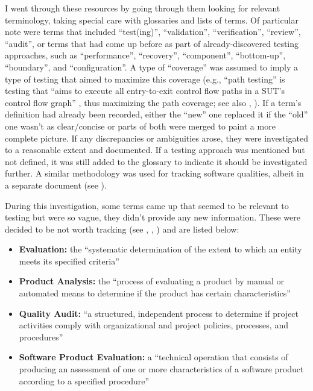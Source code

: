 I went through these resources by going through them looking for relevant
terminology, taking special care with glossaries and lists of terms. Of
particular note were terms that included ``test(ing)'', ``validation'',
``verification'', ``review'', ``audit'', or terms that had come up before
as part of already-discovered testing approaches, such as ``performance'',
``recovery'', ``component'', ``bottom-up'', ``boundary'', and ``configuration''.
A type of ``coverage'' was assumed to imply a type of testing that aimed to
maximize this coverage (e.g., ``path testing'' is testing that ``aims to
execute all entry-to-exit control flow paths in a SUT's control flow graph''
\citep[p.~5013]{SWEBOK2024}, thus maximizing the path coverage; see also
, \citet[Fig.~1]{SharmaEtAl2021}).
If a term's definition had already been recorded, either the ``new'' one
replaced it if the ``old'' one wasn't as clear/concise or parts of both were
merged to paint a more complete picture. If any discrepancies or ambiguities
arose, they were investigated to a reasonable extent and documented. If a
testing approach was mentioned but not defined, it was still added to the
glossary to indicate it should be investigated further. A similar methodology
was used for tracking software qualities, albeit in a separate document
(see ).

During this investigation, some terms came up that seemed to be relevant to
testing but were so vague, they didn't provide any new information. These were
decided to be not worth tracking (see , ,
) and are listed below:

\begin{itemize}
      \item \textbf{Evaluation:} the ``systematic determination of the extent
            to which an entity meets its specified criteria''
            \citep[p.~167]{IEEE2017}
      \item \textbf{Product Analysis:} the ``process of evaluating a product by
            manual or automated means to determine if the product has certain
            characteristics'' \citep[p.~343]{IEEE2017}
      \item \textbf{Quality Audit:} ``a structured, independent process to
            determine if project activities comply with organizational and
            project policies, processes, and procedures'' \citep[p.~361]{IEEE2017}
      \item \textbf{Software Product Evaluation:} a ``technical operation that
            consists of producing an assessment of one or more characteristics
            of a software product according to a specified procedure''
            \citep[p.~424]{IEEE2017}
\end{itemize}

